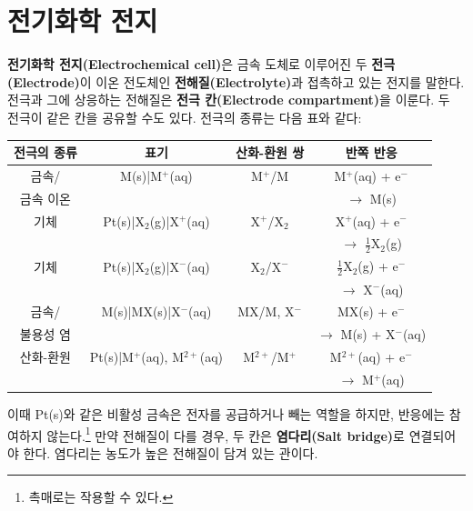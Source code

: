         \section{전기화학 전지}\label{echemcell}
        \hspace{\parindent} \textbf{전기화학 전지(Electrochemical cell)}은 금속 도체로 이루어진 두 \textbf{전극(Electrode)}이 
        이온 전도체인 \textbf{전해질(Electrolyte)}과 접촉하고 있는 전지를 말한다. 전극과 그에 상응하는 전해질은 \textbf{전극 칸(Electrode compartment)}을 이룬다. 
        두 전극이 같은 칸을 공유할 수도 있다. 전극의 종류는 다음 표와 같다:
        \begin{table}[H]
            \centering
            \begin{tabular}{ c c c c }
                \hline
                \rowcolor{lightgray}
                전극의 종류 & 표기 & 산화-환원 쌍 & 반쪽 반응 \\
                \hline
                금속/ & M(s)|M$^{+}$(aq) & M$^{+}$/M & M$^{+}$(aq) + e$^{-}$ \\
                금속 이온 & & & $\rightarrow$ M(s)\\
                \hline
                기체 & Pt(s)|X$_2$(g)|X$^{+}$(aq) & X$^{+}$/X$_2$ & X$^{+}$(aq) + e$^{-}$ \\
                 & & & $\rightarrow$ $\frac{1}{2}$X$_2$(g) \\
                \hline
                기체 & Pt(s)|X$_2$(g)|X$^{-}$(aq) & X$_2$/X$^{-}$ & $\frac{1}{2}$X$_2$(g) + e$^{-}$ \\
                 & & & $\rightarrow$ X$^{-}$(aq) \\
                \hline
                금속/ & M(s)|MX(s)|X$^{-}$(aq) & MX/M, X$^{-}$ & MX(s) + e$^{-}$ \\
                불용성 염 & & & $\rightarrow$ M(s) + X$^{-}$(aq) \\
                \hline
                산화-환원 & Pt(s)|M$^{+}$(aq), M$^{2+}$(aq) & M$^{2+}$/M$^{+}$ & M$^{2+}$(aq) + e$^{-}$ \\
                 & & & $\rightarrow$ M$^{+}$(aq) \\
                \hline
            \end{tabular}
        \end{table}
        이때 Pt(s)와 같은 비활성 금속은 전자를 공급하거나 빼는 역할을 하지만, 반응에는 참여하지 않는다.\footnote[16]{촉매로는 작용할 수 있다.} 
        만약 전해질이 다를 경우, 두 칸은 \textbf{염다리(Salt bridge)}로 연결되어야 한다. 염다리는 농도가 높은 전해질이 담겨 있는 관이다. 
